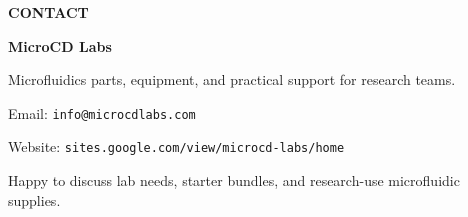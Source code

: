 \documentclass[aspectratio=169]{beamer}
\newcommand{\muted}[1]{%
  {\color{MicroCDMuted}#1}
}
\begin{document}
\begin{frame}[plain]

  \hspace{0.9cm}
  \begin{minipage}{0.78\textwidth}
    \vspace{2.4em}
    {\footnotesize\bfseries\color{MicroCDCoral}CONTACT}

    \vspace{1.1em}
    {\Huge\bfseries MicroCD Labs}

    \vspace{0.6em}
    {\Large Microfluidics parts, equipment, and practical support for research teams.}

    \vspace{1.3em}
    Email: \texttt{info@microcdlabs.com}

    Website: \texttt{sites.google.com/view/microcd-labs/home}

    \vspace{1.3em}
    \muted{Happy to discuss lab needs, starter bundles, and research-use microfluidic supplies.}
  \end{minipage}
\end{frame}
\end{document}
